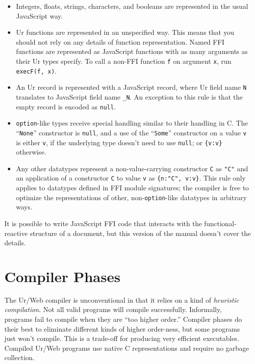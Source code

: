 \documentclass{article}
\begin{document}
\begin{itemize}
\item Integers, floats, strings, characters, and booleans are represented in the usual JavaScript way.
\item Ur functions are represented in an unspecified way.  This means that you should not rely on any details of function representation.  Named FFI functions are represented as JavaScript functions with as many arguments as their Ur types specify.  To call a non-FFI function \texttt{f} on argument \texttt{x}, run \texttt{execF(f, x)}.
\item An Ur record is represented with a JavaScript record, where Ur field name \texttt{N} translates to JavaScript field name \texttt{\_N}.  An exception to this rule is that the empty record is encoded as \texttt{null}.
\item \texttt{option}-like types receive special handling similar to their handling in C.  The ``\texttt{None}'' constructor is \texttt{null}, and a use of the ``\texttt{Some}'' constructor on a value \texttt{v} is either \texttt{v}, if the underlying type doesn't need to use \texttt{null}; or \texttt{\{v:v\}} otherwise.
\item Any other datatypes represent a non-value-carrying constructor \texttt{C} as \texttt{"C"} and an application of a constructor \texttt{C} to value \texttt{v} as \texttt{\{n:"C", v:v\}}.  This rule only applies to datatypes defined in FFI module signatures; the compiler is free to optimize the representations of other, non-\texttt{option}-like datatypes in arbitrary ways.
\end{itemize}

It is possible to write JavaScript FFI code that interacts with the functional-reactive structure of a document, but this version of the manual doesn't cover the details.


\section{Compiler Phases}

The Ur/Web compiler is unconventional in that it relies on a kind of \emph{heuristic compilation}.  Not all valid programs will compile successfully.  Informally, programs fail to compile when they are ``too higher order.''  Compiler phases do their best to eliminate different kinds of higher order-ness, but some programs just won't compile.  This is a trade-off for producing very efficient executables.  Compiled Ur/Web programs use native C representations and require no garbage collection.
\end{document}
